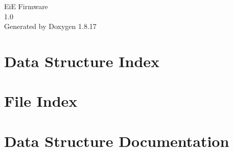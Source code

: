 \let\mypdfximage\pdfximage\def\pdfximage{\immediate\mypdfximage}\documentclass[twoside]{book}
\newcommand{\+}{\discretionary{\mbox{\scriptsize$\hookleftarrow$}}{}{}}
\newcommand{\clearemptydoublepage}{%
  \newpage{\pagestyle{empty}\cleardoublepage}%
}
\begin{document}
\hypersetup{pageanchor=false,
             bookmarksnumbered=true,
             pdfencoding=unicode
            }
\begin{titlepage}
\vspace*{7cm}
\begin{center}%
{\Large EiE Firmware \\[1ex]\large 1.\+0 }\\
\vspace*{1cm}
{\large Generated by Doxygen 1.8.17}\\
\end{center}
\end{titlepage}
\clearemptydoublepage
{}
\tableofcontents
\clearemptydoublepage
{}
\hypersetup{pageanchor=true}

\chapter{Data Structure Index}

\chapter{File Index}

\chapter{Data Structure Documentation}










































\end{document}
